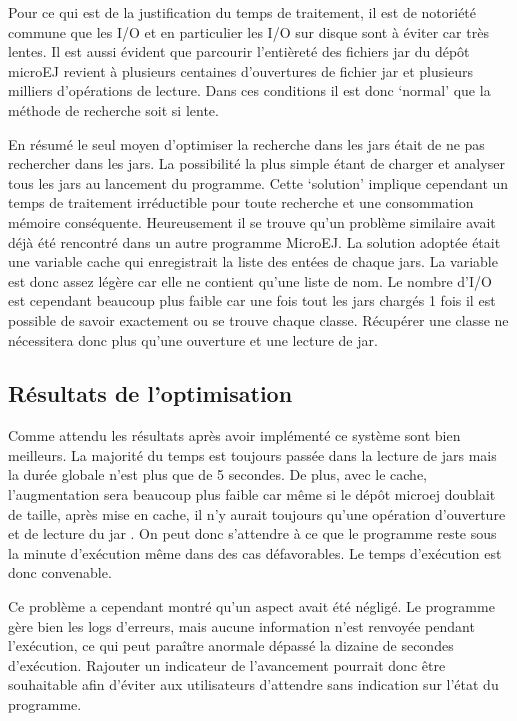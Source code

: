\documentclass[french,a4paper,12pt]{report}
\begin{document}
Pour ce qui est de la justification du temps de traitement, il est de notoriété commune que les I/O et en particulier les I/O sur disque sont à éviter car très lentes. Il est aussi évident que parcourir l’entièreté des fichiers jar du dépôt microEJ revient à plusieurs centaines d’ouvertures de fichier jar et plusieurs milliers d’opérations de lecture. Dans ces conditions il est donc ‘normal’ que la méthode de recherche soit si lente.

En résumé le seul moyen d’optimiser la recherche dans les jars était de ne pas rechercher dans les jars. La possibilité la plus simple étant de charger et analyser tous les jars au lancement du programme. Cette ‘solution’ implique cependant un temps de traitement irréductible pour toute recherche et une consommation mémoire conséquente. Heureusement il se trouve qu’un problème similaire avait déjà été rencontré dans un autre programme MicroEJ. La solution adoptée était une variable cache qui enregistrait la liste des entées de chaque jars. La variable est donc assez légère car elle ne contient qu’une liste de nom. Le nombre d’I/O est cependant beaucoup plus faible car une fois tout les jars chargés 1 fois il est possible de savoir exactement ou se trouve chaque classe. Récupérer une classe ne nécessitera donc plus qu’une ouverture et une lecture de jar.

\subsection{Résultats de l’optimisation}

Comme attendu les résultats après avoir implémenté ce système sont bien meilleurs.
La majorité du temps est toujours passée dans la lecture de jars mais la durée globale n’est plus que de 5 secondes. De plus, avec le cache, l’augmentation sera beaucoup plus faible car même si le dépôt microej doublait de taille, après mise en cache, il n’y aurait toujours qu’une opération d’ouverture et de lecture du jar . On peut donc s’attendre à ce que le programme reste sous la minute d’exécution même dans des cas défavorables.  Le temps d’exécution est donc convenable.

Ce problème a cependant montré qu'un aspect avait été négligé. Le programme gère bien les logs d’erreurs, mais aucune information n’est renvoyée pendant l’exécution, ce qui peut paraître anormale dépassé la dizaine de secondes d’exécution. Rajouter un indicateur de l’avancement pourrait donc être souhaitable afin d’éviter aux utilisateurs d’attendre sans indication sur l’état du programme.
\end{document}
